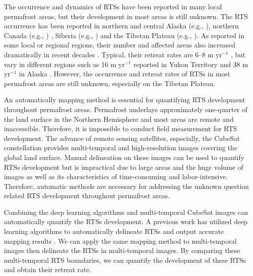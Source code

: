\documentclass[authoryear,preprint,review,12pt]{elsarticle}
\begin{document}
The occurrence and dynamics of RTSs have been reported in many local permafrost areas, but their development in most areas is still unknown. 
The RTS occurrence has been reported in northern and central Alaska (e.g., \citealp{swanson2018growth,balser2014timing}), northern Canada (e.g., \citealp{burn1990canadian, cassidy2017impacts, armstrong2018thaw,lewkowicz2019extremes}) , Siberia (e.g., \citealp{leibman2003dynamics, zwieback2018sub}) and the Tibetan Plateau (e.g., \citealp{niu2005engineering, niu2016thaw}). 
As reported in some local or regional regions, their number and affected areas also increased dramatically in recent decades \citep{luo2019recent, lewkowicz2019extremes}.
Typical, their retreat rates are 6--8 m yr$^{-1}$ \citep{jorgenson_thermokarst_2013}, but vary in different regions such as 16 m yr$^{-1}$ reported in Yukon Territory \citep{burn1989geomorphology} and 38 m yr$^{-1}$  in Alaska \citep{swanson2018growth}.
However, the occurrence and retreat rates of RTSs in most permafrost areas are still unknown, especially on the Tibetan Plateau. 

An automatically mapping method is essential for quantifying RTS development throughout permafrost areas. 
Permafrost underlays approximately one-quarter of the land surface in the Northern Hemisphere \citep{zhang1999statistics} and most areas are remote and inaccessible. 
Therefore, it is impossible to conduct field measurement for RTS development. 
The advance of remote sensing satellites, especially, the CubeSat constellation provides multi-temporal and high-resolution images covering the global land surface. 
Manual delineation on these images can be used to quantify RTSs development but is impractical due to large areas and the huge volume of images as well as its characteristics of time-consuming and labor-intensive. 
Therefore, automatic methods are necessary for addressing the unknown question related RTS development throughout permafrost areas. 


Combining the deep learning algorithms and multi-temporal CubeSat images can automatically quantify the RTSs development.
A previous work has utilized deep learning algorithms to automatically delineate RTSs and output accurate mapping results \citep{huang2020using}. 
We can apply the same mapping method to multi-temporal images then delineate the RTSs in multi-temporal images. 
By comparing these multi-temporal RTS boundaries, we can quantify the development of these RTSs and obtain their retreat rate. 
\end{document}
